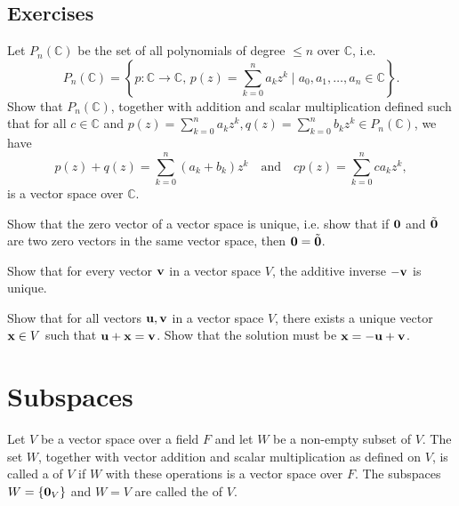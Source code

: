 \subsection*{Exercises}

\begin{exer}\label{exer:pnvs}
Let $ P_n(\mathbb{C}) $ be the set of all polynomials of degree $ \leq n $ over $ \mathbb{C} $, i.e.
\begin{equation*}
    P_n(\mathbb{C})=\left\{p:\mathbb{C}\to\mathbb{C},\,p(z)=\sum_{k=0}^n a_k z^k\mid a_0,a_1,\ldots,a_n\in \mathbb{C}\right\}.
\end{equation*}
Show that $ P_n(\mathbb{C}) $, together with addition and scalar multiplication defined such that for all $ c\in\mathbb{C} $ and $ p(z)=\sum_{k=0}^n a_k z^k,q(z)=\sum_{k=0}^n b_k z^k\in P_n(\mathbb{C}) $, we have
\begin{equation*}
    p(z)+q(z)=\sum_{k=0}^n (a_k+b_k)z^k \quad\text{and}\quad cp(z)=\sum_{k=0}^n ca_k z^k,
\end{equation*}
is a vector space over $ \mathbb{C} $.
\end{exer}

\begin{exer}\label{exer:0unique}
Show that the zero vector of a vector space is unique, i.e. show that if $ \mathbf{0} $ and $ \tilde{\mathbf{0}} $ are two zero vectors in the same vector space, then $ \mathbf{0}=\tilde{\mathbf{0}} $.
\end{exer}

\begin{exer}
Show that for every vector $ \mathbf{v} $ in a vector space $ V $, the additive inverse $ -\mathbf{v} $ is unique.
\end{exer}

\begin{exer}
Show that for all vectors $ \mathbf{u},\mathbf{v} $ in a vector space $ V $, there exists a unique vector $ \mathbf{x}\in V $ such that $ \mathbf{u}+\mathbf{x}=\mathbf{v} $. Show that the solution must be $ \mathbf{x}=-\mathbf{u}+\mathbf{v} $.
\end{exer}

\section{Subspaces}

\begin{defn}
Let $ V $ be a vector space over a field $ F $ and let $ W $ be a non-empty subset of $ V $. The set $ W $, together with vector addition and scalar multiplication as defined on $ V $, is called a  of $ V $ if $ W $ with these operations is a vector space over $ F $. The subspaces $ W=\{\mathbf{0}_V\} $ and $ W=V $ are called the  of $ V $.
\end{defn}

